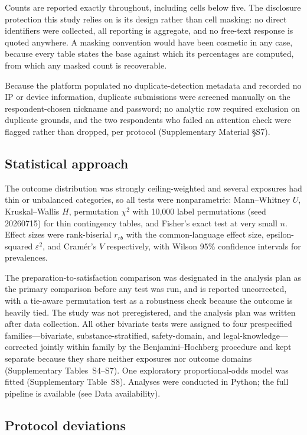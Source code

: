 \documentclass[12pt]{article}
\begin{document}
Counts are reported exactly throughout, including cells below five. The disclosure protection this study
relies on is its design rather than cell masking: no direct identifiers were collected, all reporting is
aggregate, and no free-text response is quoted anywhere. A masking convention would have been cosmetic in
any case, because every table states the base against which its percentages are computed, from which any
masked count is recoverable.

Because the platform populated no duplicate-detection metadata and recorded no IP or device information,
duplicate submissions were screened manually on the respondent-chosen nickname and password; no analytic
row required exclusion on duplicate grounds, and the two respondents who failed an attention check were
flagged rather than dropped, per protocol (Supplementary Material \S S7).

\subsection{Statistical approach}

The outcome distribution was strongly ceiling-weighted and several exposures had thin or unbalanced
categories, so all tests were nonparametric: Mann--Whitney $U$, Kruskal--Wallis $H$, permutation $\chi^2$
with 10,000 label permutations (seed 20260715) for thin contingency tables, and Fisher's exact test at very
small $n$. Effect sizes were rank-biserial $r_{rb}$ with the common-language effect size, epsilon-squared
$\varepsilon^2$, and Cram\'er's $V$ respectively, with Wilson 95\% confidence intervals for prevalences.

The preparation-to-satisfaction comparison was designated in the analysis plan as the primary comparison
before any test was run, and is reported uncorrected, with a tie-aware permutation test as a robustness
check because the outcome is heavily tied. The study was not preregistered, and the analysis plan was
written after data collection. All other bivariate tests were assigned to four prespecified
families---bivariate, substance-stratified, safety-domain, and legal-knowledge---corrected jointly within
family by the Benjamini--Hochberg procedure and kept separate because they share neither exposures nor
outcome domains (Supplementary Tables~S4--S7). One exploratory proportional-odds model was fitted
(Supplementary Table~S8). Analyses were conducted in Python; the full pipeline is available (see Data
availability).

\subsection{Protocol deviations}
\end{document}
